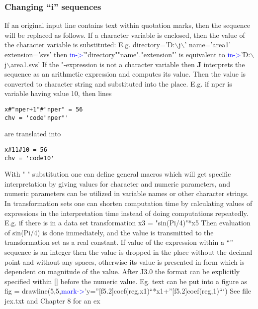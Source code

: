 \subsubsection{Changing “i” sequences}
\label{inpureplace}
If an original input line contains text within quotation marks, then the sequence will be replaced
as follows. If a character variable is enclosed, then the value of the character variable is
substituted: E.g.
directory='D:$\backslash$j$\backslash$'
name='area1'
extension='svs'
then
\textcolor{blue}{in->}'"directory""name"."extension"'
is equivalent to
\textcolor{blue}{in->}'D:$\backslash$j$\backslash$area1.svs'
If the "-expression is not a character variable then \textbf{J} interprets the sequence as an arithmetic
expression and computes its value. Then the value is converted to character string and
substituted into the place. E.g. if nper is variable having value 10, then lines
\color{Green}
\begin{verbatim}
x#"nper+1"#"nper" = 56
chv = 'code"nper"'
\end{verbatim}
\color{Black}
are translated into
\color{Green}
\begin{verbatim}
x#11#10 = 56
chv = 'code10'
\end{verbatim}
\color{Black}
With " " substitution one can define general macros which will get specific interpretation by
giving values for character and numeric parameters, and numeric parameters can be utilized in
variable names or other character strings. In transformation sets one can shorten computation
time by calculating values of expressions in the interpretation time instead of doing
computations repeatedly. E.g. if there is in a data set transformation
x3 = "\textcolor{VioletRed}{sin}(Pi/4)"*x5
Then evaluation of \textcolor{VioletRed}{sin}(Pi/4) is done immediately, and the value is transmitted to the
transformation set as a real constant.
If value of the expression within a “” sequence is an integer then the value is dropped in the
place without the decimal point and without any spaces, otherwise its value is presented in
form which is dependent on magnitude of the value. After J3.0 the format can be explicitly
specified within [] before the numeric value. Eg. text can be put into a figure as
fig =
\textcolor{VioletRed}{drawline}(5,5,\textcolor{blue}{mark->}’y=”[f5.2]coef(reg,x1)“*x1+”[f5.2]coef(reg,1)“‘)
See file jex.txt and Chapter 8 for an ex
